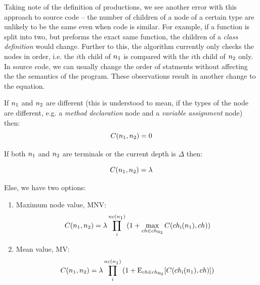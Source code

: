 Taking note of the definition of productions, we see another error with this
approach to source code -- the number of children of a node of a certain type
are unlikely to be the same even when code is similar. For example, if a function
is split into two, but preforms the exact same function, the children of a
\emph{class definition} would change. Further to this, the algorithm currently
only checks the nodes in order, i.e. the $i$th child of $n\textsubscript{1}$ is
compared with the $i$th child of $n\textsubscript{2}$ only. In source code, we
can usually change the order of statments without affecting the the semantics
of the program. These observations result in another change to the equation.

If $n\textsubscript{1}$ and $n\textsubscript{2}$ are different (this is understood
to mean, if the types of the node are different, e.g. a \emph{method declaration}
node and a \emph{variable assignment} node)
then:
\begin{equation}
C(n\textsubscript{1}, n\textsubscript{2}) = 0
\end{equation}

If both $n\textsubscript{1}$ and $n\textsubscript{2}$ are terminals or the
current depth is $\Delta$ then:

\begin{equation}
C(n\textsubscript{1}, n\textsubscript{2}) = \lambda
\end{equation}

Else, we have two options:

\begin{enumerate}
\item Maximum node value, MNV:
\begin{equation}
C(n\textsubscript{1}, n\textsubscript{2}) = \lambda\prod_{i}^{nc(n\textsubscript{1})}
{(1+\max_{ch \in ch \textsubscript{n\textsubscript{2}}}{C(ch\textsubscript{i}
(n\textsubscript{1}), ch))}}
\end{equation}

\item Mean value, MV:
\begin{equation}
C(n\textsubscript{1}, n\textsubscript{2}) = \lambda\prod_{i}^{nc(n\textsubscript{1})}
{(1+\mathrm{E}_{ch \in ch \textsubscript{n\textsubscript{2}}}{[C(ch\textsubscript{i}
(n\textsubscript{1}), ch)])}}
\end{equation}
\end{enumerate}
\label{secondImprovementParseTreeKernel}
\cite{ParseTreeKernel}

